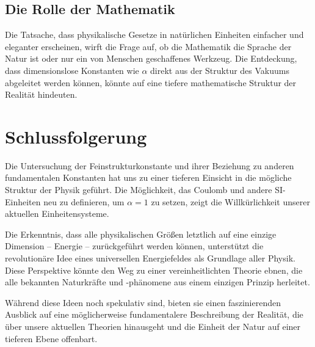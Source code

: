 \documentclass{article}
\begin{document}
\subsection{Die Rolle der Mathematik}

Die Tatsache, dass physikalische Gesetze in natürlichen Einheiten einfacher und eleganter erscheinen, wirft die Frage auf, ob die Mathematik die Sprache der Natur ist oder nur ein von Menschen geschaffenes Werkzeug. Die Entdeckung, dass dimensionslose Konstanten wie $\alpha$ direkt aus der Struktur des Vakuums abgeleitet werden können, könnte auf eine tiefere mathematische Struktur der Realität hindeuten.

\section{Schlussfolgerung}

Die Untersuchung der Feinstrukturkonstante und ihrer Beziehung zu anderen fundamentalen Konstanten hat uns zu einer tieferen Einsicht in die mögliche Struktur der Physik geführt. Die Möglichkeit, das Coulomb und andere SI-Einheiten neu zu definieren, um $\alpha = 1$ zu setzen, zeigt die Willkürlichkeit unserer aktuellen Einheitensysteme.

Die Erkenntnis, dass alle physikalischen Größen letztlich auf eine einzige Dimension – Energie – zurückgeführt werden können, unterstützt die revolutionäre Idee eines universellen Energiefeldes als Grundlage aller Physik. Diese Perspektive könnte den Weg zu einer vereinheitlichten Theorie ebnen, die alle bekannten Naturkräfte und -phänomene aus einem einzigen Prinzip herleitet.

Während diese Ideen noch spekulativ sind, bieten sie einen faszinierenden Ausblick auf eine möglicherweise fundamentalere Beschreibung der Realität, die über unsere aktuellen Theorien hinausgeht und die Einheit der Natur auf einer tieferen Ebene offenbart.
	
\end{document}
